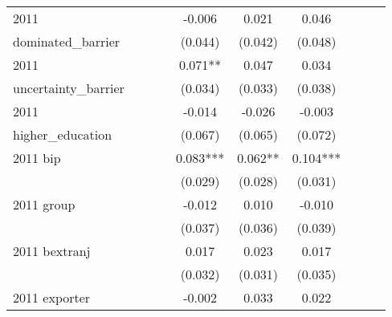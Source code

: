 \begin{table}[htbp]
\begin{tabular}{l*{9}{c}}
2011                &               &               &               &      -0.006   &       0.021   &       0.046   &               &               &               \\
dominated\_barrier   &               &               &               &     (0.044)   &     (0.042)   &     (0.048)   &               &               &               \\
2011                &               &               &               &       0.071** &       0.047   &       0.034   &               &               &               \\
uncertainty\_barrier &               &               &               &     (0.034)   &     (0.033)   &     (0.038)   &               &               &               \\
2011                &               &               &               &      -0.014   &      -0.026   &      -0.003   &               &               &               \\
higher\_education    &               &               &               &     (0.067)   &     (0.065)   &     (0.072)   &               &               &               \\
2011 bip            &               &               &               &       0.083***&       0.062** &       0.104***&               &               &               \\
                    &               &               &               &     (0.029)   &     (0.028)   &     (0.031)   &               &               &               \\
2011 group          &               &               &               &      -0.012   &       0.010   &      -0.010   &               &               &               \\
                    &               &               &               &     (0.037)   &     (0.036)   &     (0.039)   &               &               &               \\
2011 bextranj       &               &               &               &       0.017   &       0.023   &       0.017   &               &               &               \\
                    &               &               &               &     (0.032)   &     (0.031)   &     (0.035)   &               &               &               \\
2011 exporter       &               &               &               &      -0.002   &       0.033   &       0.022   &               &               &               \\

\end{tabular}
\end{table}
